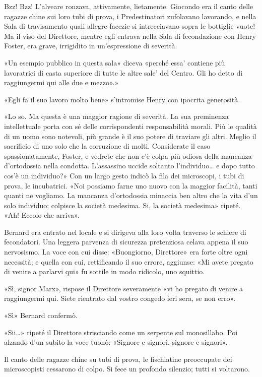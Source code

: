 \documentclass[
a5paper, %
10pt, %
twoside, 
onecolumn, %
openany, %
]{memoir}
\begin{document}
Bzz! Bzz! L’alveare ronzava, attivamente, lietamente. Giocondo era il canto delle ragazze chine sui loro tubi di prova, i Predestinatori zufolavano lavorando, e nella Sala di travisamento quali allegre facezie si intrecciavano sopra le bottiglie vuote! Ma il viso del Direttore, mentre egli entrava nella Sala di fecondazione con Henry Foster, era grave, irrigidito in un’espressione di severità.

«Un esempio pubblico in questa sala» diceva «perché essa’ contiene più lavoratrici di casta superiore di tutte le altre sale’ del Centro. Gli ho detto di raggiungermi qui alle due e mezzo».»

«Egli fa il suo lavoro molto bene» s’intromise Henry con ipocrita generosità.

«Lo so. Ma questa è una maggior ragione di severità. La sua preminenza intellettuale porta con sé delle corrispondenti responsabilità morali. Più le qualità di un uomo sono notevoli, più grande è il suo potere di traviare gli altri. Meglio il sacrificio di uno solo che la corruzione di molti. Considerate il caso spassionatamente, Foster, e vedrete che non c’è colpa più odiosa della mancanza d’ortodossia nella condotta. L’assassino uccide soltanto l’individuo… e dopo tutto cos’è un individuo?» Con un largo gesto indicò la fila dei microscopi, i tubi di prova, le incubatrici. «Noi possiamo farne uno nuovo con la maggior facilità, tanti quanti ne vogliamo. La mancanza d’ortodossia minaccia ben altro che la vita d’un solo individuo; colpisce la società medesima. Si, la società medesima» ripeté. «Ah! Eccolo che arriva».

Bernard era entrato nel locale e si dirigeva alla loro volta traverso le schiere di fecondatori. Una leggera parvenza di sicurezza pretenziosa celava appena il suo nervosismo. La voce con cui disse: «Buongiorno, Direttore» era forte oltre ogni necessità; e quella con cui, rettificando il suo errore, aggiunse: «Mi avete pregato di venire a parlarvi qui» fu sottile in modo ridicolo, uno squittio.

«Sì, signor Marx», rispose il Direttore severamente «vi ho pregato di venire a raggiungermi qui. Siete rientrato dal vostro congedo ieri sera, se non erro».

«Sì» Bernard confermò.

«Sii…» ripeté il Direttore strisciando come un serpente sul monosillabo. Poi alzando d’un subito la voce tuonò: «Signore e signori, signore e signori».

Il canto delle ragazze chine su tubi di prova, le fischiatine preoccupate dei microscopisti cessarono di colpo. Si fece un profondo silenzio; tutti si voltarono.
\end{document}
